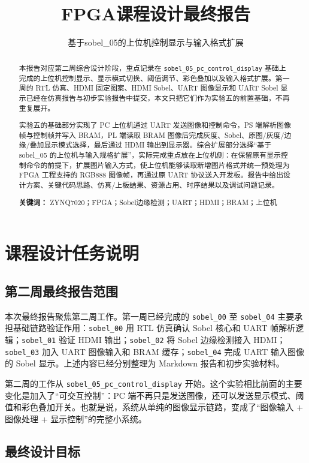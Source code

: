 \documentclass[12pt,a4paper]{ctexart}
\title{FPGA课程设计最终报告}
\subtitle{基于sobel\_05的上位机控制显示与输入格式扩展}
\begin{document}
\makecover

\newpage
\begin{abstract}
本报告对应第二周综合设计阶段，重点记录在 \verb|sobel_05_pc_control_display| 基础上完成的上位机控制显示、显示模式切换、阈值调节、彩色叠加以及输入格式扩展。第一周的 RTL 仿真、HDMI 固定图案、HDMI Sobel、UART 图像显示和 UART Sobel 显示已经在仿真报告与初步实验报告中提交，本文只把它们作为实验五的前置基础，不再重复展开。

实验五的基础部分实现了 PC 上位机通过 UART 发送图像和控制命令，PS 端解析图像帧与控制帧并写入 BRAM，PL 端读取 BRAM 图像后完成灰度、Sobel、原图/灰度/边缘/叠加显示模式选择，最后通过 HDMI 输出到显示器。综合扩展部分选择“基于 sobel\_05 的上位机与输入规格扩展”，实际完成重点放在上位机侧：在保留原有显示控制命令的前提下，扩展图片输入方式，使上位机能够读取新增图片格式并统一预处理为 FPGA 工程支持的 RGB888 图像帧，再通过原 UART 协议送入开发板。报告中给出设计方案、关键代码思路、仿真/上板结果、资源占用、时序结果以及调试问题记录。

\par
\textbf{关键词：} ZYNQ7020；FPGA；Sobel边缘检测；UART；HDMI；BRAM；上位机
\end{abstract}

\tableofcontents
\clearpage
{}
\setcounter{page}{1}

\section{课程设计任务说明}

\subsection{第二周最终报告范围}

本次最终报告聚焦第二周工作。第一周已经完成的 \verb|sobel_00| 至 \verb|sobel_04| 主要承担基础链路验证作用：\verb|sobel_00| 用 RTL 仿真确认 Sobel 核心和 UART 帧解析逻辑；\verb|sobel_01| 验证 HDMI 输出；\verb|sobel_02| 将 Sobel 边缘检测接入 HDMI；\verb|sobel_03| 加入 UART 图像输入和 BRAM 缓存；\verb|sobel_04| 完成 UART 输入图像的 Sobel 显示。上述内容已经分别整理为 Markdown 报告和初步实验材料。

第二周的工作从 \verb|sobel_05_pc_control_display| 开始。这个实验相比前面的主要变化是加入了“可交互控制”：PC 端不再只是发送图像，还可以发送显示模式、阈值和彩色叠加开关。也就是说，系统从单纯的图像显示链路，变成了“图像输入 + 图像处理 + 显示控制”的完整小系统。

\subsection{最终设计目标}
\end{document}
